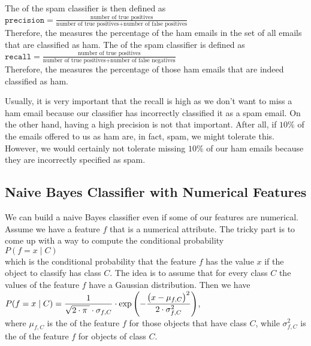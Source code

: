 \begin{enumerate}
      The  of the spam classifier is then defined as
      \\[0.2cm]
      \hspace*{1.3cm}
      $ \texttt{precision} = \frac{\mbox{number of true positives}}{\mbox{number of true positives} + \mbox{number of false positives}} $
      \\[0.2cm]
      Therefore, the  measures the percentage of the ham emails in the set of all emails that are classified as ham.
      The  of the spam classifier is defined as
      \\[0.2cm]
      \hspace*{1.3cm}
      $ \texttt{recall} = \frac{\mbox{number of true positives}}{\mbox{number of true positives} + \mbox{number of false negatives}} $
      \\[0.2cm]
      Therefore, the  measures the percentage of those ham emails that are indeed classified as ham.  

      Usually, it is very important that the recall is high as we don't want to miss a ham email because our classifier has incorrectly classified it as a spam email.  
      On the other hand, having a high precision is not that important.  After all, if $10\%$ of the emails
      offered to us as ham are, in fact, spam, we might tolerate this.  However, we
      would certainly not tolerate missing $10\%$ of our ham emails because they are
      incorrectly specified as spam.       
\end{enumerate}

\subsection{Naive Bayes Classifier with Numerical Features}
We can build a naive Bayes classifier even if some of our features are numerical.  Assume we have a feature $f$
that is a numerical attribute.  The tricky part is to come up with a way to compute the conditional probability
\\[0.2cm]
\hspace*{1.3cm}
$P(f = x \mid C)$
\\[0.2cm]
which is the conditional probability that the feature $f$ has the value $x$ if the object to classify has class
$C$.  The idea is to assume that for every class $C$ the values of the feature $f$ have a Gaussian
distribution.  Then we have
\\[0.2cm]
\hspace*{1.3cm}
$\displaystyle P(f = x \mid C) = \frac{1}{\sqrt{2\cdot\pi\;} \cdot \sigma_{f,C}} \cdot \exp\left(-\frac{\bigl(x-\mu_{f,C}\bigr)^2}{2 \cdot \sigma_{f,C}^2}\right)$,
\\[0.2cm]
where $\mu_{f,C}$ is the  of the feature $f$ for those objects that have class $C$, while
$\sigma_{f,C}^2$ is the  of the feature $f$ for objects of class $C$.


